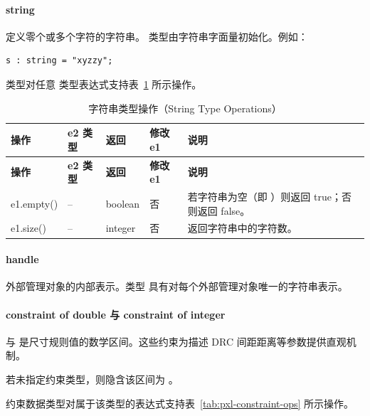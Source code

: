 \paragraph{string}

定义零个或多个字符的字符串。 类型由字符串字面量初始化。例如：
\begin{lstlisting}[style=pxl]
s : string = "xyzzy";
\end{lstlisting}

 类型对任意  类型表达式支持表~\ref{tab:pxl-string-ops} 所示操作。

\begin{longtable}{@{}>{\raggedright\arraybackslash\ttfamily}p{} p{} p{} p{} p{}@{}}
\caption{字符串类型操作（String Type Operations）}\label{tab:pxl-string-ops}\\
\toprule
\textbf{\textrm{操作}} & \textbf{\textrm{e2 类型}} & \textbf{\textrm{返回}} & \textbf{\textrm{修改 e1}} & \textbf{\textrm{说明}} \\
\midrule
\endfirsthead
\toprule
\textbf{\textrm{操作}} & \textbf{\textrm{e2 类型}} & \textbf{\textrm{返回}} & \textbf{\textrm{修改 e1}} & \textbf{\textrm{说明}} \\
\midrule
\endhead
\bottomrule
\endfoot
e1.empty() & -- & boolean & 否 & 若字符串为空（即 \cmd{""}）则返回 true；否则返回 false。 \\
e1.size() & -- & integer & 否 & 返回字符串中的字符数。 \\
\end{longtable}

\paragraph{handle}

外部管理对象的内部表示。类型  具有对每个外部管理对象唯一的字符串表示。

\paragraph{constraint of double 与 constraint of integer}

 与  是尺寸规则值的数学区间。这些约束为描述 DRC 间距距离等参数提供直观机制。

若未指定约束类型，则隐含该区间为 。

约束数据类型对属于该类型的表达式支持表~\ref{tab:pxl-constraint-ops} 所示操作。

